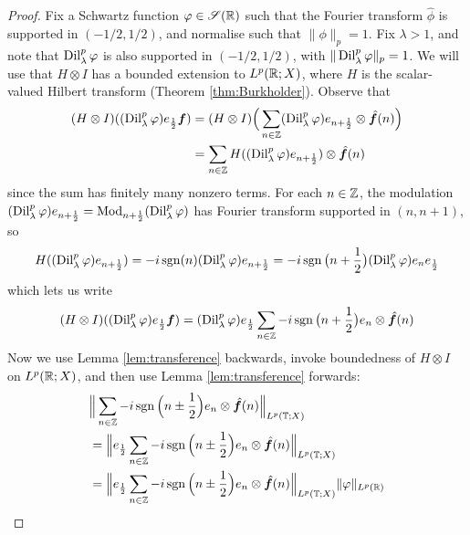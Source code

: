 \begin{proof}
    Fix a Schwartz function $\varphi \in \mathscr{S}(\mathbb{R})$ such that the Fourier transform $\hat{\phi}$ is supported in $(-1/2,1/2)$, and normalise such that $\|\phi\|_{p} = 1$.
    Fix $\lambda > 1$, and note that $\operatorname{Dil}^{p}_{\lambda}\varphi$ is also supported in $(-1/2,1/2)$, with $\|\operatorname{Dil}^{p}_{\lambda}\varphi\|_{p} = 1$.
    We will use that $H \otimes I$ has a bounded extension to $L^p(\mathbb{R};X)$, where $H$ is the scalar-valued Hilbert transform (Theorem \ref{thm:Burkholder}).
    Observe that
    \begin{equation*}
      \begin{aligned}
        (H \otimes I)((\operatorname{Dil}_{\lambda}^{p} \varphi) e_{\frac{1}{2}} \bm{f})
        &= (H \otimes I)\Big( \sum_{n \in \mathbb{Z}} (\operatorname{Dil}_{\lambda}^{p} \varphi) e_{n + \frac{1}{2}} \otimes \hat{\bm{f}}(n) \Big) \\
        &= \sum_{n \in \mathbb{Z}} H((\operatorname{Dil}_{\lambda}^{p}\varphi) e_{n + \frac{1}{2}}) \otimes \hat{\bm{f}}(n)
      \end{aligned}
    \end{equation*}
    since the sum has finitely many nonzero terms.
    For each $n \in \mathbb{Z}$, the modulation $(\operatorname{Dil}_{\lambda}^{p}\varphi) e_{n + \frac{1}{2}} = \operatorname{Mod}_{n + \frac{1}{2}} (\operatorname{Dil}_{\lambda}^{p}\varphi)$ has Fourier transform supported in $(n, n+1)$, so
    \begin{equation*}
          H((\operatorname{Dil}_{\lambda}^{p}\varphi) e_{n + \frac{1}{2}}) = -i\operatorname{sgn}(n) (\operatorname{Dil}_{\lambda}^{p}\varphi) e_{n + \frac{1}{2}} = -i\operatorname{sgn}\big(n+\frac{1}{2}\big) (\operatorname{Dil}_{\lambda}^{p}\varphi) e_{n} e_{\frac{1}{2}}
    \end{equation*}
    which lets us write
    \begin{equation*}
       (H \otimes I)((\operatorname{Dil}_{\lambda}^{p}\varphi) e_{\frac{1}{2}} \bm{f}) = (\operatorname{Dil}_{\lambda}^{p}\varphi) e_{\frac{1}{2}} \sum_{n \in \mathbb{Z}} -i\operatorname{sgn}\big(n + \frac{1}{2}\big)  e_{n} \otimes \hat{\bm{f}}(n)
     \end{equation*}
     Now we use Lemma \ref{lem:transference} backwards, invoke boundedness of $H \otimes I$ on $L^p(\mathbb{R};X)$, and then use Lemma \ref{lem:transference} forwards:
     \begin{equation*}
       \begin{aligned}
         &\Big\| \sum_{n \in \Z} -i \sgn\Big(n\pm\frac{1}{2}\Big) e_{n} \otimes \hat{\mb{f}}(n) \Big\|_{L^p(\T;X)} \\
         &= \Big\| e_{\frac{1}{2}} \sum_{n \in \Z} -i \sgn\Big(n\pm\frac{1}{2}\Big) e_{n} \otimes \hat{\mb{f}}(n) \Big\|_{L^p(\T;X)} \\
         &= \Big\| e_{\frac{1}{2}} \sum_{n \in \Z} -i \sgn\Big(n\pm\frac{1}{2}\Big) e_{n} \otimes \hat{\mb{f}}(n) \Big\|_{L^p(\T;X)} \|\phi\|_{L^p(\R)} \\

\end{aligned}
\end{equation*}
\end{proof}
